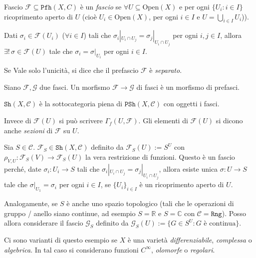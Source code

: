 \begin{definition}{Fascio}
    \(\mathcal{F} \subseteq \mathtt{Pfh}{(X, C)} \) è un \emph{fascio} se
    \(\forall U \subseteq \mathrm{Open}{(X)} \) e per ogni \(\{U_{i}: i \in I\}
    \) ricoprimento aperto di \(U\) (cioè \(U_{i} \in \mathrm{Open}{(X)}\), per
    ogni \(i \in I\) e \(U = \bigcup_{i \in I} U_{i}\))).

    Dati \(\sigma_{i} \in \mathcal{F}{(U_{i})}\) (\(\forall i \in I\)) tali che
    \(\sigma_{i} |_{U_{i} \cap U_{j}} = \sigma_{j} |_{U_{i} \cap U_{j}} \) per
    ogni \(i, j \in I\), allora \(\exists ! \, \sigma \in \mathcal{F}{(U)}\)
    tale che \(\sigma_{i} = \sigma|_{U_{i}} \) per ogni \(i \in I\).

    Se Vale solo l'unicità, si dice che il prefascio \(\mathcal{F}\) è
    \emph{separato}.
\end{definition}

Siano \(\mathcal{F}, \mathcal{G}\) due fasci. Un morfismo \(\mathcal{F} \to
\mathcal{G}\) di fasci è un morfismo di prefasci. 

\(\mathtt{Sh}{(X, \mathcal{C})}\) è la sottocategoria piena di
\(\mathtt{PSh}{(X, \mathcal{C})}\) con oggetti i fasci.

\begin{note}[zione]
    Invece di \(\mathcal{F}{(U)}\) si può scrivere \(\Gamma_f{(U, %
    \mathcal{F})}\). Gli elementi di \(\mathcal{F}{(U)}\) si dicono anche
    \emph{sezioni} di \(\mathcal{F}\) su \(U\).
\end{note}

\begin{example}{}
    Sia \(S \in \mathcal{C}\). \(\mathcal{F}_{S} \in \mathtt{Sh}{(X,
    \mathcal{C})}\) definito da \(\mathcal{F}_S{(U)} := S^{U}\) con \(\rho_{V,U}
    : \mathcal{F}_S {(V)} \to \mathcal{F}_S{(U)}\) la vera restrizione di
    funzioni. Questo è un fascio perché, date \(\sigma_{i} : U_{i} \to S\) tali
    che \(\sigma_{i} |_{U_{i} \cap U_{j}} = \sigma_{j} |_{U_{i} \cap U_{j}}  \),
    allora esiste unica \(\sigma : U \to S\) tale che \(\sigma|_{U_{1}} =
    \sigma_{i}\) per ogni \(i \in I\), se \(\{U_{i}\}_{i \in I} \) è un
    ricoprimento aperto di \(U\).

    Analogamente, se \(S\) è anche uno spazio topologico (tali che le operazioni
    di gruppo / anello siano continue, ad esempio \(S = \mathbb{R}\) e \(S =
    \mathbb{C}\) con \(\mathcal{C} = \mathtt{Rng}\)). Posso allora considerare
    il fascio \(\mathcal{G}_{S} \) definito da \(\mathcal{G}_S {(U)} := \{G \in
    S^{U} : G\text{ è continua}\}\).

    Ci sono varianti di questo esempio se \(X\) è una varietà
    \emph{differenziabile}, \emph{complessa} o \emph{algebrica}. In tal caso
    si considerano funzioni \(C^{\infty}\), \emph{olomorfe} o
    \emph{regolari}.
\end{example}

